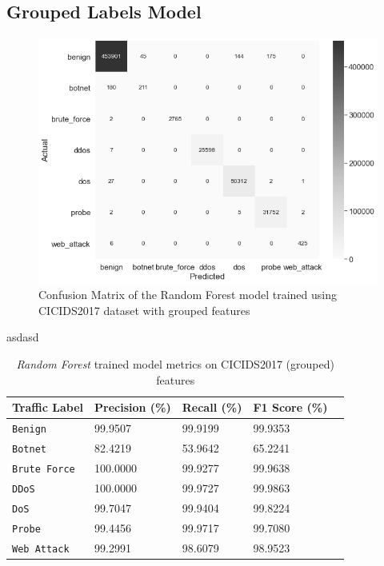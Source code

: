 \subsection{Grouped Labels Model}
\label{subsec:grouped-training}

\begin{figure}[h!]
   \centering
   \includegraphics[scale=0.52]{assets/figures/chapter3/grouped_confusion_matrix.png}
   \caption{Confusion Matrix of the Random Forest model trained using CICIDS2017 dataset with grouped features}
   \label{fig:grouped-confusion-matrix}
\end{figure}

asdasd
\begin{table}[h!]
   \centering
   \begin{tabular}{l|llll}
       \toprule 
       Traffic Label & Precision (\%) & Recall (\%) & F1 Score (\%) \\
       \midrule
       \rowcolor{black!10} \texttt{Benign} & 99.9507 & 99.9199 & 99.9353 \\
       \texttt{Botnet} & 82.4219 & 53.9642 & 65.2241 \\
       \rowcolor{black!10} \texttt{Brute Force} & 100.0000 & 99.9277 & 99.9638 \\
       \texttt{DDoS} & 100.0000 & 99.9727 & 99.9863 \\
       \rowcolor{black!10} \texttt{DoS} & 99.7047 & 99.9404 & 99.8224 \\
       \texttt{Probe} & 99.4456 & 99.9717 & 99.7080 \\
       \rowcolor{black!10} \texttt{Web Attack} & 99.2991 & 98.6079 & 98.9523 \\
       \bottomrule
   \end{tabular}
   \caption{\textit{Random Forest} trained model metrics on CICIDS2017 (grouped) features}
   \label{tab:grouped-metrics}
\end{table}

